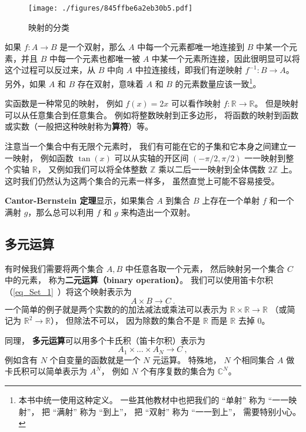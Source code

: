 \begin{figure}[ht]
\centering
\texttt{[image: ./figures/845ffbe6a2eb30b5.pdf]}
\caption{映射的分类} \label{fig_map_1}
\end{figure}

如果 $f: A \to B$ 是一个双射，那么 $A$ 中每一个元素都唯一地连接到 $B$ 中某一个元素，并且 $B$ 中每一个元素也都唯一被 $A$ 中某一个元素所连接，因此很明显可以将这个过程可以反过来，从 $B$ 中向 $A$ 中拉连接线，即我们有逆映射 $f^{-1}: B \to A$。另外，如果 $A$ 和 $B$ 存在双射，意味着 $A$ 和 $B$ 的元素数量应该一致\footnote{本书中统一使用这种定义。 一些其他教材中也把我们的 “单射” 称为 “一一映射”， 把 “满射” 称为 “到上”， 把 “双射” 称为 “一一到上”， 需要特别小心。}。

实函数是一种常见的映射， 例如 $f(x) = 2x$ 可以看作映射 $f: \mathbb R \to \mathbb R$。 但是映射可以从任意集合到任意集合。 例如将整数映射到正多边形， 将函数的映射到函数或实数（一般把这种映射称为\textbf{算符}）等。

注意当一个集合中有无限个元素时， 我们有可能在它的子集和它本身之间建立一一映射， 例如函数 $\tan(x)$ 可以从实轴的开区间 $(-\pi/2, \pi/2)$ 一一映射到整个实轴 $\mathbb R$， 又例如我们可以将全体整数 $\mathbb Z$ 乘以二后一一映射到全体偶数 $2\mathbb Z$ 上。 这时我们仍然认为这两个集合的元素一样多， 虽然直觉上可能不容易接受。

\textbf{Cantor-Bernstein 定理}显示，如果集合 $A$ 到集合 $B$ 上存在一个单射 $f$ 和一个满射 $g$，那么总可以利用 $f$ 和 $g$ 来构造出一个双射。

\subsection{多元运算}\label{sub_map_1}
有时候我们需要将两个集合 $A, B$ 中任意各取一个元素， 然后映射另一个集合 $C$ 中的元素， 称为\textbf{二元运算（binary operation）}。 我们可以使用笛卡尔积（\autoref{eq_Set_1}~）将这个映射表示为
\begin{equation}\label{eq_map_1}
A \times B \to C~.
\end{equation}
一个简单的例子就是两个实数的的加法减法或乘法可以表示为 $\mathbb R \times \mathbb R \to \mathbb R$ （或简记为 $\mathbb R^2 \to \mathbb R$）， 但除法不可以， 因为除数的集合不是 $\mathbb R$ 而是 $\mathbb R$ 去掉 $0$。


同理， \textbf{多元运算}可以用多个卡氏积（笛卡尔积）表示为
\begin{equation}
A_1 \times \dots \times A_N \to C~,
\end{equation}
例如含有 $N$ 个自变量的函数就是一个 $N$ 元运算。 特殊地， $N$ 个相同集合 $A$ 做卡氏积可以简单表示为 $A^N$， 例如 $N$ 个有序复数的集合为 $\mathbb C^N$。

